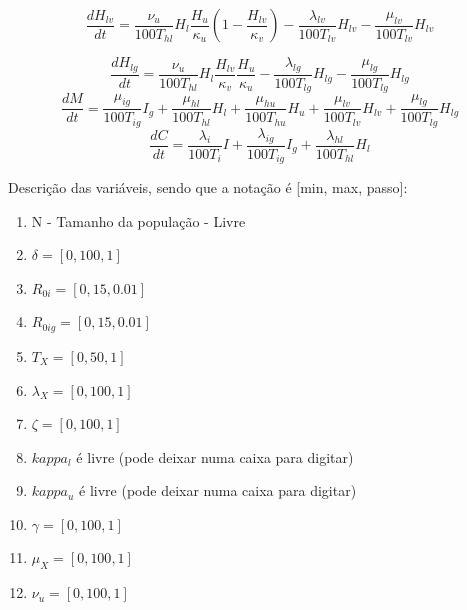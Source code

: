 \documentclass{article}
\begin{document}
\begin{equation}
	\frac{dH_{lv}}{dt}=\frac{\nu_u}{100T_{hl}} H_l\frac{H_u}{\kappa_{u}}(1-\frac{H_{lv}}{\kappa_{v}})  - \frac{\lambda_{lv}}{100T_{lv}}H_{lv}-\frac{\mu_{lv}}{100T_{lv}}H_{lv}
\end{equation}

\begin{equation}
	\frac{dH_{lg}}{dt}=\frac{\nu_u}{100T_{hl}} H_l\frac{H_{lv}}{\kappa_{v}}\frac{H_u}{\kappa_{u}} -\frac{\lambda_{lg}}{100T_{lg}}H_{lg}-\frac{\mu_{lg}}{100T_{lg}}H_{lg}
\end{equation}
\begin{equation}
	\frac{dM}{dt}=\frac{\mu_{ig}}{100 T_{ig}}I_{g} +\frac{\mu_{hl}}{100 T_{hl}}H_l + \frac{\mu_{hu}}{100 T_{hu}}H_u +\frac{\mu_{lv}}{100 T_{lv}} H_{lv}+\frac{\mu_{lg}}{100 T_{lg}} H_{lg}
\end{equation}
\begin{equation}
	\frac{dC}{dt}=\frac{\lambda_i}{100 T_{i}} I + \frac{\lambda_{ig}}{100 T_{ig}} I_g +\frac{\lambda_{hl}}{100 T_{hl}}H_l 
\end{equation}

Descrição das variáveis, sendo que a notação é [min, max, passo]:
\begin{enumerate}
	\item N - Tamanho da população - Livre
	\item $\delta = [0, 100, 1]$
	\item $R_{0i} = [0, 15, 0.01]$
	\item $R_{0ig} = [0, 15, 0.01]$
	\item $T_{X} = [0, 50, 1]$
	\item $\lambda_X = [0,100, 1]$
	\item $\zeta = [0, 100, 1]$
	\item $kappa_l$ é livre (pode deixar numa caixa para digitar)
	\item  $kappa_u$ é livre (pode deixar numa caixa para digitar)
	\item $\gamma = [0,100, 1]$
	\item $\mu_{X} = [0,100, 1]$
	\item $\nu_u = [0,100,1]$
	      	      	      	      	      	      	      	      	      	      	      	      	      	      	      	      	      	      	      	      	      	      	      	      	      	      	      	      	      	      	      	      	      	      	      	      	      	      	      	      	      	
\end{enumerate}
\end{document}
